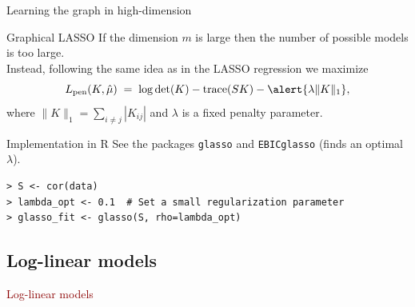 \documentclass[11pt,handout,aspectratio=169,dvipsnames]{beamer}
\begin{document}
\begin{frame}[fragile]{Learning the graph in high-dimension}
\begin{alertblock}{Graphical LASSO}
	If the dimension $m$ is large then the number of possible models is too large.\\[.2cm]


Instead, following the same idea as in the LASSO regression we maximize
$$
L_{\rm pen}(K,\hat \mu)\;=\;\log\det (K)-\tr(SK)-\alert{\lambda \|K\|_1},
$$
where $\|K\|_1=\sum_{i\neq j}|K_{ij}|$ and $\lambda$ is a fixed penalty parameter.
\end{alertblock}
\begin{block}{Implementation in R}
	See the packages \texttt{glasso} and \texttt{EBICglasso} (finds an optimal $\lambda$).
	\begin{lstlisting}
> S <- cor(data)
> lambda_opt <- 0.1  # Set a small regularization parameter
> glasso_fit <- glasso(S, rho=lambda_opt)
\end{lstlisting}
\end{block}

%
\end{frame}





\subsection{Log-linear models}

\begin{frame}{}
\begin{center}
	{\huge \textcolor{DarkRed}{Log-linear models}}
\end{center}
\end{frame}
\end{document}
